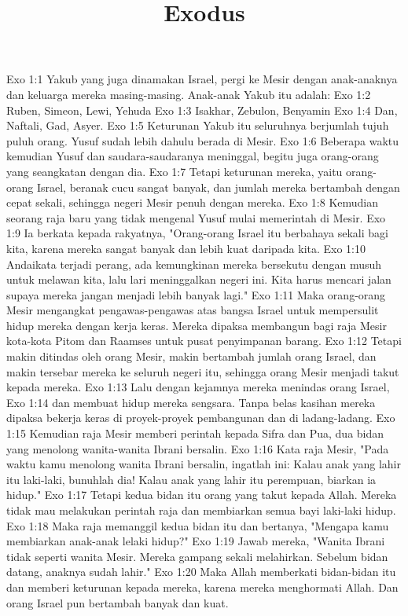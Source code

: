 

\title{Exodus}

Exo 1:1  Yakub yang juga dinamakan Israel, pergi ke Mesir dengan anak-anaknya dan keluarga mereka masing-masing. Anak-anak Yakub itu adalah:
Exo 1:2  Ruben, Simeon, Lewi, Yehuda
Exo 1:3  Isakhar, Zebulon, Benyamin
Exo 1:4  Dan, Naftali, Gad, Asyer.
Exo 1:5  Keturunan Yakub itu seluruhnya berjumlah tujuh puluh orang. Yusuf sudah lebih dahulu berada di Mesir.
Exo 1:6  Beberapa waktu kemudian Yusuf dan saudara-saudaranya meninggal, begitu juga orang-orang yang seangkatan dengan dia.
Exo 1:7  Tetapi keturunan mereka, yaitu orang-orang Israel, beranak cucu sangat banyak, dan jumlah mereka bertambah dengan cepat sekali, sehingga negeri Mesir penuh dengan mereka.
Exo 1:8  Kemudian seorang raja baru yang tidak mengenal Yusuf mulai memerintah di Mesir.
Exo 1:9  Ia berkata kepada rakyatnya, "Orang-orang Israel itu berbahaya sekali bagi kita, karena mereka sangat banyak dan lebih kuat daripada kita.
Exo 1:10  Andaikata terjadi perang, ada kemungkinan mereka bersekutu dengan musuh untuk melawan kita, lalu lari meninggalkan negeri ini. Kita harus mencari jalan supaya mereka jangan menjadi lebih banyak lagi."
Exo 1:11  Maka orang-orang Mesir mengangkat pengawas-pengawas atas bangsa Israel untuk mempersulit hidup mereka dengan kerja keras. Mereka dipaksa membangun bagi raja Mesir kota-kota Pitom dan Raamses untuk pusat penyimpanan barang.
Exo 1:12  Tetapi makin ditindas oleh orang Mesir, makin bertambah jumlah orang Israel, dan makin tersebar mereka ke seluruh negeri itu, sehingga orang Mesir menjadi takut kepada mereka.
Exo 1:13  Lalu dengan kejamnya mereka menindas orang Israel,
Exo 1:14  dan membuat hidup mereka sengsara. Tanpa belas kasihan mereka dipaksa bekerja keras di proyek-proyek pembangunan dan di ladang-ladang.
Exo 1:15  Kemudian raja Mesir memberi perintah kepada Sifra dan Pua, dua bidan yang menolong wanita-wanita Ibrani bersalin.
Exo 1:16  Kata raja Mesir, "Pada waktu kamu menolong wanita Ibrani bersalin, ingatlah ini: Kalau anak yang lahir itu laki-laki, bunuhlah dia! Kalau anak yang lahir itu perempuan, biarkan ia hidup."
Exo 1:17  Tetapi kedua bidan itu orang yang takut kepada Allah. Mereka tidak mau melakukan perintah raja dan membiarkan semua bayi laki-laki hidup.
Exo 1:18  Maka raja memanggil kedua bidan itu dan bertanya, "Mengapa kamu membiarkan anak-anak lelaki hidup?"
Exo 1:19  Jawab mereka, "Wanita Ibrani tidak seperti wanita Mesir. Mereka gampang sekali melahirkan. Sebelum bidan datang, anaknya sudah lahir."
Exo 1:20  Maka Allah memberkati bidan-bidan itu dan memberi keturunan kepada mereka, karena mereka menghormati Allah. Dan orang Israel pun bertambah banyak dan kuat.
